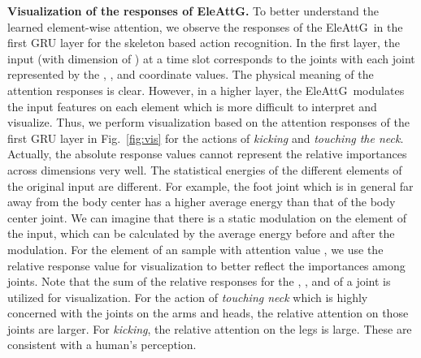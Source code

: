 \documentclass[runningheads]{llncs}
\newcommand{\EleAttGn}{{EleAttG}}
\newcommand{\EleAttG}{{EleAttG~}}
\begin{document}
\noindent\textbf{Visualization of the responses of \EleAttGn.} To better understand the learned element-wise attention, we observe the responses of the \EleAttG in the first GRU layer for the skeleton based action recognition. In the first layer, the input (with dimension of ) at a time slot corresponds to the  joints with each joint represented by the , , and  coordinate values. The physical meaning of the attention responses is clear. However, in a higher layer, the \EleAttG modulates the input features on each element which is more difficult to interpret and visualize. Thus, we perform visualization based on the attention responses of the first GRU layer in Fig.~\ref{fig:vis} for the actions of \emph{kicking} and \emph{touching the neck}. 
Actually, the absolute response values cannot represent the relative importances across dimensions very well. The statistical energies of the different elements of the original input are different. For example, the foot joint which is in general far away from the body center has a higher average energy than that of the body center joint. We can imagine that there is a static modulation  on the  element of the input, which can be calculated by the average energy before and after the modulation. For the  element of an sample  with attention value , we use the relative response value  for visualization to better reflect the importances among joints. Note that the sum of the relative responses for the , , and  of a joint is utilized for visualization. For the action of \emph{touching neck}  which is highly concerned with the joints on the arms and heads, the relative attention on those joints are larger. For \emph{kicking}, the relative attention on the legs is large. These are consistent with a human's perception.  
\end{document}

